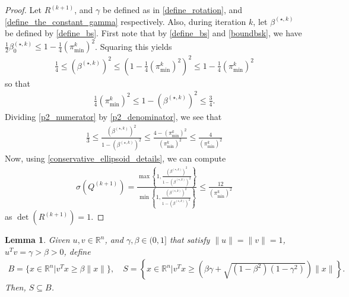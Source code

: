 \documentclass{article}
\newtheorem{lemma}[theorem]{Lemma}
\theoremstyle{case}
\numberwithin{theorem}{subsection}
\newcommand{\bs}{{\beta^{(\star, k)}}}
\newcommand{\bsk}{{\beta_0^{(\star, k)}}}
\newcommand{\ck}{{c^{(k)}}}
\newcommand{\dk}{\Delta_k}
\newcommand{\huk}{{{\hat u}^{(k)}}}
\newcommand{\qk}{{Q^{(k)}}}
\newcommand{\Rn}{\mathbb R^n}
\newcommand{\rotk}{{R^{(k+1)}}}
\newcommand{\sdk}{{\delta_k}}
\newcommand{\thetamink}{{\pi^k_{\textrm{min}}}}
\newcommand{\xk}{x^{(k)}}
\newcommand{\qkpo}{{Q^{(k+1)}}}
\begin{document}
\begin{proof}
Let $\rotk$, and $\gamma$ be defined as in \cref{define_rotation}, and \cref{define_the_constant_gamma} respectively.
Also, during iteration $k$, let $\bs$ be defined by \cref{define_bs}.
First note that by \cref{define_bs} and \cref{boundbsk}, we have
$\frac 1 2 \bsk \le 1 - \frac 1 4 \left(\thetamink\right)^2$.
Squaring this yields
\begin{align}
\frac {1} 4 \le \left(\bs\right)^2 \le \left(1 - \frac 1 4 \left(\thetamink\right)^2\right)^2 \le 1 - \frac 1 4 \left(\thetamink\right)^2 \label{p2_numerator}
\end{align}
so that
\begin{align}
\frac 1 4  \left(\thetamink\right)^2 \le 1 - \left(\bs\right)^2 \le \frac 3 4. \label{p2_denominator}
\end{align}
Dividing \cref{p2_numerator} by \cref{p2_denominator}, we see that
\begin{align*}
\frac 1 3
\le \frac{\left(\bs\right)^2}{1 - \left(\bs\right)^2}
\le \frac {4 - \left(\thetamink\right)^2}{\left(\thetamink\right)^2} \le \frac {4}{\left(\thetamink\right)^2}
\end{align*}
Now, using \cref{conservative_ellipsoid_details}, we can compute 
\begin{align*}
\sigma \left(\qkpo\right) 
= \frac{\max\left\{1, \frac{\left(\bs\right)^2}{1 - \left(\bs\right)^2}\right\}}{\min\left\{1, \frac{\left(\bs\right)^2}{1 - \left(\bs\right)^2}\right\}} 
\le \frac {12}{\left(\thetamink\right)^2}
\end{align*}
as $\det(\rotk) = 1$.
\end{proof}




\begin{lemma}
\label{cone_subset_cone}
Given $u, v \in \Rn$, and $\gamma, \beta \in (0, 1]$ that satisfy $\|u\| = \|v\|= 1$, $u^Tv = \gamma > \beta > 0$, define
\begin{align*}
B = \{x\in\Rn | {v}^Tx \ge \beta\|x\|\}, \quad
S = \left\{x\in\Rn \bigg| v^Tx \ge \left(\beta\gamma + \sqrt{(1 - \beta^2)\left(1 - \gamma^2\right)}\right)\|x\| \right\}. 
\end{align*}
Then, $S \subseteq B$.
\end{lemma}
\end{document}
